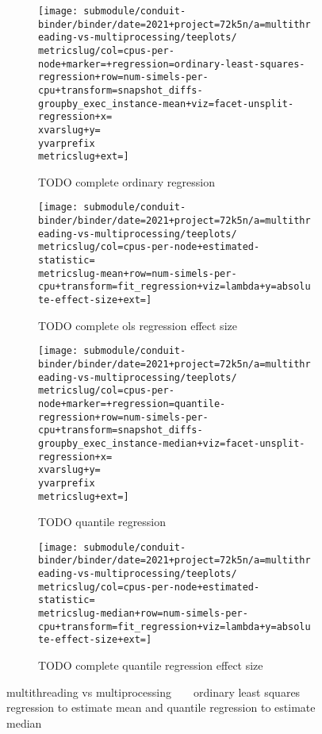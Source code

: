 \begin{figure*}
  \centering

  \begin{subfigure}[b]{0.5\textwidth}
    \centering
    \texttt{[image: submodule/conduit-binder/binder/date=2021+project=72k5n/a=multithreading-vs-multiprocessing/teeplots/\\metricslug/col=cpus-per-node+marker=+regression=ordinary-least-squares-regression+row=num-simels-per-cpu+transform=snapshot\_diffs-groupby\_exec\_instance-mean+viz=facet-unsplit-regression+x=\\xvarslug+y=\\yvarprefix\\metricslug+ext=]}
    \caption{TODO complete ordinary regression}
    \label{fig:multithreading-vs-multiprocessing-regression-ols-\metricslug-complete-regression}
  \end{subfigure}%
  \begin{subfigure}[b]{0.5\textwidth}
    \centering
    \texttt{[image: submodule/conduit-binder/binder/date=2021+project=72k5n/a=multithreading-vs-multiprocessing/teeplots/\\metricslug/col=cpus-per-node+estimated-statistic=\\metricslug-mean+row=num-simels-per-cpu+transform=fit\_regression+viz=lambda+y=absolute-effect-size+ext=]}
    \caption{TODO complete ols regression effect size}
    \label{fig:multithreading-vs-multiprocessing-regression-ols-\metricslug-complete-effect-size}
  \end{subfigure}

  \begin{subfigure}[b]{0.5\textwidth}
    \centering
    \texttt{[image: submodule/conduit-binder/binder/date=2021+project=72k5n/a=multithreading-vs-multiprocessing/teeplots/\\metricslug/col=cpus-per-node+marker=+regression=quantile-regression+row=num-simels-per-cpu+transform=snapshot\_diffs-groupby\_exec\_instance-median+viz=facet-unsplit-regression+x=\\xvarslug+y=\\yvarprefix\\metricslug+ext=]}
    \caption{TODO quantile regression}
    \label{fig:multithreading-vs-multiprocessing-regression-quantile-\metricslug-complete-regression}
  \end{subfigure}%
  \begin{subfigure}[b]{0.5\textwidth}
    \centering
    \texttt{[image: submodule/conduit-binder/binder/date=2021+project=72k5n/a=multithreading-vs-multiprocessing/teeplots/\\metricslug/col=cpus-per-node+estimated-statistic=\\metricslug-median+row=num-simels-per-cpu+transform=fit\_regression+viz=lambda+y=absolute-effect-size+ext=]}
    \caption{TODO complete quantile regression effect size}
    \label{fig:multithreading-vs-multiprocessing-regression-quantile-\metricslug-complete-effect-size}
  \end{subfigure}

  \caption{multithreading vs multiprocessing ~ \metric ~ ordinary least squares regression to estimate mean and quantile regression to estimate median}
  \label{fig:multithreading-vs-multiprocessing-regression-\metricslug}
\end{figure*}
